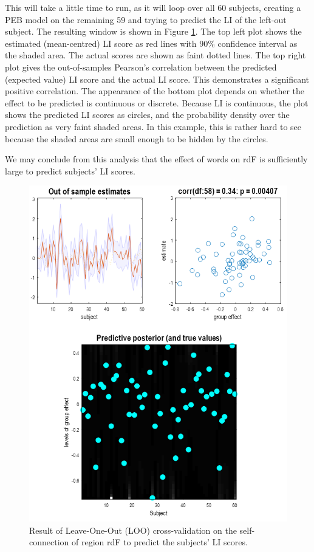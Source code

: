 \documentclass{article}
\begin{document}
This will take a little time to run, as it will loop over all 60 subjects, creating a PEB model on the remaining 59 and trying to predict the LI of the left-out subject. The resulting window is shown in Figure \ref{Fig_peb_loo_gui}. The top left plot shows the estimated (mean-centred) LI score as red lines with 90\% confidence interval as the shaded area. The actual scores are shown as faint dotted lines. The top right plot gives the out-of-samples Pearson's correlation between the predicted (expected value) LI score and the actual LI score. This demonstrates a significant positive correlation. The appearance of the bottom plot depends on whether the effect to be predicted is continuous or discrete. Because LI is continuous, the plot shows the predicted LI scores as circles, and the probability density over the prediction as very faint shaded areas. In this example, this is rather hard to see because the shaded areas are small enough to be hidden by the circles. 

We may conclude from this analysis that the effect of words on rdF is sufficiently large to predict subjects' LI scores.

\begin{figure}[ht]
\begin{center}
\includegraphics{"Fig_peb_loo_gui"}
\caption{Result of Leave-One-Out (LOO) cross-validation on the self-connection of region rdF to predict the subjects' LI scores.\label{Fig_peb_loo_gui}}
\end{center}
\end{figure}
\end{document}
